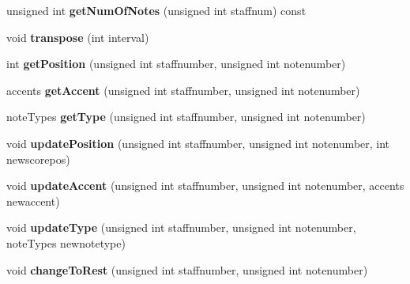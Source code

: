 \begin{DoxyCompactItemize}
\item 
\hypertarget{class_score_view_model_afd65004f27e1f03a7aab8c1c9b6635e4}{}unsigned int {\bfseries get\+Num\+Of\+Notes} (unsigned int staffnum) const \label{class_score_view_model_afd65004f27e1f03a7aab8c1c9b6635e4}

\item 
\hypertarget{class_score_view_model_adc09e48006e07d05cd06d28f85731ec4}{}void {\bfseries transpose} (int interval)\label{class_score_view_model_adc09e48006e07d05cd06d28f85731ec4}

\item 
\hypertarget{class_score_view_model_afc656d3b87cfcab65e2e2df84275811d}{}int {\bfseries get\+Position} (unsigned int staffnumber, unsigned int notenumber)\label{class_score_view_model_afc656d3b87cfcab65e2e2df84275811d}

\item 
\hypertarget{class_score_view_model_ac9ba2d57c16d6e20f4c3da111b73615f}{}accents {\bfseries get\+Accent} (unsigned int staffnumber, unsigned int notenumber)\label{class_score_view_model_ac9ba2d57c16d6e20f4c3da111b73615f}

\item 
\hypertarget{class_score_view_model_a6714358745b284c08d6cec01449ff306}{}note\+Types {\bfseries get\+Type} (unsigned int staffnumber, unsigned int notenumber)\label{class_score_view_model_a6714358745b284c08d6cec01449ff306}

\item 
\hypertarget{class_score_view_model_ab83b04a6d5678338e8b5712d5715048d}{}void {\bfseries update\+Position} (unsigned int staffnumber, unsigned int notenumber, int newscorepos)\label{class_score_view_model_ab83b04a6d5678338e8b5712d5715048d}

\item 
\hypertarget{class_score_view_model_a634fd237d616540d5031a64a72d3ddbf}{}void {\bfseries update\+Accent} (unsigned int staffnumber, unsigned int notenumber, accents newaccent)\label{class_score_view_model_a634fd237d616540d5031a64a72d3ddbf}

\item 
\hypertarget{class_score_view_model_ad78152fc30e09d58422e4671462d5884}{}void {\bfseries update\+Type} (unsigned int staffnumber, unsigned int notenumber, note\+Types newnotetype)\label{class_score_view_model_ad78152fc30e09d58422e4671462d5884}

\item 
\hypertarget{class_score_view_model_ac2247ce41cb07e55d007819e55dbc47b}{}void {\bfseries change\+To\+Rest} (unsigned int staffnumber, unsigned int notenumber)\label{class_score_view_model_ac2247ce41cb07e55d007819e55dbc47b}


\end{DoxyCompactItemize}
